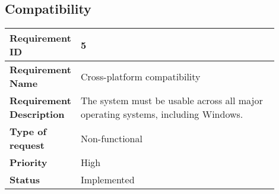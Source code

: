 \subsection{Compatibility}
\begin{table}[htbp]
\centering
\begin{tabular}{|m{0.15\linewidth}|m{0.75\linewidth}|}
\hline
\textbf{Requirement ID} & 5 \\
\hline
\textbf{Requirement Name} & Cross-platform compatibility \\
\hline
\textbf{Requirement Description} & The system must be usable across all major operating systems, including Windows. \\
\hline
\textbf{Type of request} & Non-functional \\
\hline
\textbf{Priority} & High \\
\hline
\textbf{Status} & Implemented \\
\hline
\end{tabular}
\end{table}

